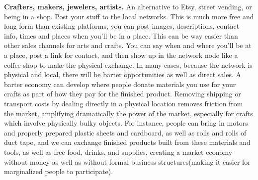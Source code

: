 \documentclass{report}
\begin{document}
\textbf{Crafters, makers, jewelers, artists.} An alternative to Etsy,
street vending, or being in a shop. Post your stuff to the local
networks. This is much more free and long form than existing platforms,
you can post images, descriptions, contact info, times and places when
you'll be in a place. This can be way easier than other sales channels
for arts and crafts. You can say when and where you'll be at a place,
post a link for contact, and then show up in the network node like a
coffee shop to make the physical exchange. In many cases, because the
network is physical and local, there will be barter opportunities as
well as direct sales. A barter economy can develop where people donate
materials you use for your crafts as part of how they pay for the
finished product. Removing shipping or transport costs by dealing
directly in a physical location removes friction from the market,
amplifying dramatically the power of the market, especially for crafts
which involve physically bulky objects. For instance, people can bring
in motors and properly prepared plastic sheets and cardboard, as well as
rolls and rolls of duct tape, and we can exchange finished products
built from these materials and tools, as well as free food, drinks, and
supplies, creating a market economy without money as well as without
formal business structures(making it easier for marginalized people to
participate).
\end{document}
